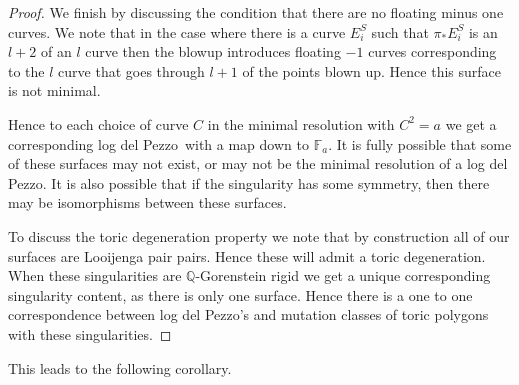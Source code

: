 \documentclass[11pt]{amsbook}
\theoremstyle{definition}
\theoremstyle{definition}
\theoremstyle{definition}
\theoremstyle{definition}
\theoremstyle{definition}
\theoremstyle{definition}
\theoremstyle{definition}
\theoremstyle{definition}
\newcommand{\ldp}{log del Pezzo}
\newcommand{\mb}[1]{\mathbb{#1}}
\newcommand{\LJ}{Looijenga pair }
\begin{document}
\begin{proof}
We finish by discussing the condition that there are no floating minus one curves. We note that in the case where there is a curve $E_i^S$ such that $\pi_* E_i^S$ is an $l+2$ of an $l$ curve then the blowup introduces floating $-1$ curves corresponding to the $l$ curve that goes through $l+1$ of the points blown up. Hence this surface is not minimal.


Hence to each choice of curve $C$ in the minimal resolution with $C^2 = a$ we get a corresponding \ldp\ with a map down to $\mb{F}_a$. It is fully possible that some of these surfaces may not exist, or may not be the minimal resolution of a \ldp. It is also possible that if the singularity has some symmetry, then there may be isomorphisms between these surfaces.


To discuss the toric degeneration property we note that by construction all of our surfaces are \LJ pairs. Hence these will admit a toric degeneration. When these singularities are $\mb{Q}$-Gorenstein rigid we get a unique corresponding singularity content, as there is only one surface. Hence there is a one to one correspondence between \ldp's and mutation classes of toric polygons with these singularities.
\end{proof}


 This leads to the following corollary.
 
\end{document}
